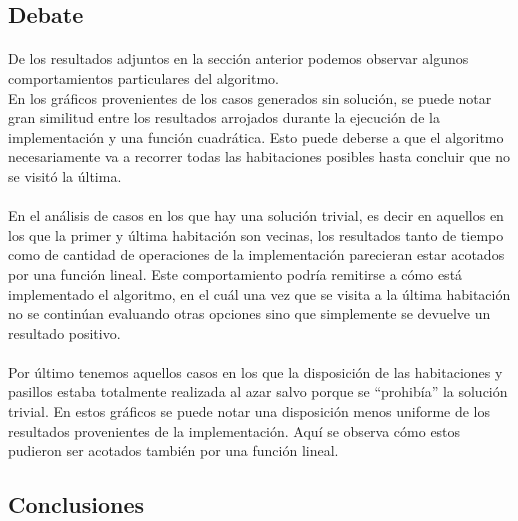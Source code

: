 \subsection{Debate}

\paragraph{}
De los resultados adjuntos en la sección anterior podemos observar algunos comportamientos particulares del algoritmo.\\
En los gráficos provenientes de los casos generados sin solución, se puede notar gran similitud entre los resultados arrojados durante la ejecución de la implementación y una función cuadrática. Esto puede deberse a que el algoritmo necesariamente va a recorrer todas las habitaciones posibles hasta concluir que no se visitó la última.

\paragraph{}
En el análisis de casos en los que hay una solución trivial, es decir en aquellos en los que la primer y última habitación son vecinas, los resultados tanto de tiempo como de cantidad de operaciones de la implementación parecieran estar acotados por una función lineal. Este comportamiento podría remitirse a cómo está implementado el algoritmo, en el cuál una vez que se visita a la última habitación no se continúan evaluando otras opciones sino que simplemente se devuelve un resultado positivo.

\paragraph{}
Por último tenemos aquellos casos en los que la disposición de las habitaciones y pasillos estaba totalmente realizada al azar salvo porque se ``prohibía'' la solución trivial. En estos gráficos se puede notar una disposición menos uniforme de los resultados provenientes de la implementación. Aquí se observa cómo estos pudieron ser acotados también por una función lineal.


\subsection{Conclusiones}

